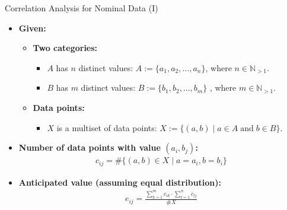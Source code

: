 \begin{frame}{Correlation Analysis for Nominal Data (I)}
	\begin{itemize}
		\item \textbf{Given:}
		      \begin{itemize}
			      \item \textbf{Two categories:}
			            \begin{itemize}
				            \item $A$ has $n$ distinct values: $A := \{a_1, a_2, \ldots,
					                  a_n\}$, where $n \in \mathbb{N}_{>1}$.
				            \item $B$ has $m$ distinct values: $B := \{b_1, b_2, \ldots,
					                  b_m\}$
				                  , where $m \in \mathbb{N}_{>1}$.
			            \end{itemize}
			      \item \textbf{Data points:}
			            \begin{itemize}
				            \item $X$ is a multiset of data points: $X := \{(a, b)
					                  \; \vert \; a \in A \; \text{and} \; b \in B\}$.
			            \end{itemize}
		      \end{itemize}
		\item \textbf{Number of data points with value $(a_i,b_j)$:}
		      \begin{align}
			      c_{ij} = \#\{(a,b) \in X \mid a = a_i, b= b_i\}
		      \end{align}
		\item \textbf{Anticipated value (assuming equal distribution):}
		      \begin{align}
			      e_{ij} = \frac{\sum_{k=1}^{m} c_{ik} \cdot \sum_{l=1}^{n}c_{lj}}{\#X}
		      \end{align}
	\end{itemize}
\end{frame}

